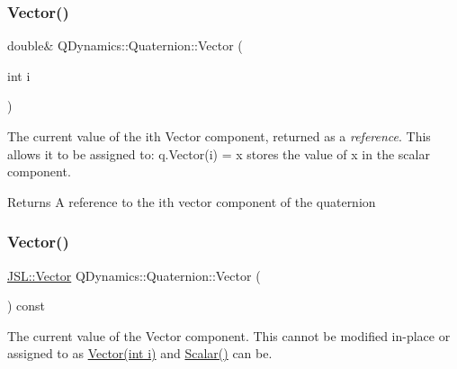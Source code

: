\mbox{\label{classQDynamics_1_1Quaternion_ad2f24d575d2fb8a50a9d4fd397115b9e}} 
\subsubsection{\texorpdfstring{Vector()}{Vector()}\hspace{0.1cm}{\footnotesize\ttfamily [1/3]}}
{\footnotesize\ttfamily double\& Q\+Dynamics\+::\+Quaternion\+::\+Vector (\begin{DoxyParamCaption}\item[{int}]{i }\end{DoxyParamCaption})\hspace{0.3cm}{\ttfamily [inline]}}



The current value of the ith Vector component, returned as a {\itshape reference}. This allows it to be assigned to\+: q.\+Vector(i) = x stores the value of x in the scalar component. 

\begin{DoxyReturn}{Returns}
A reference to the ith vector component of the quaternion 
\end{DoxyReturn}
\mbox{\label{classQDynamics_1_1Quaternion_ac35047116c055b5baeec49b8ebba0ede}} 
\subsubsection{\texorpdfstring{Vector()}{Vector()}\hspace{0.1cm}{\footnotesize\ttfamily [2/3]}}
{\footnotesize\ttfamily \hyperlink{classJSL_1_1Vector}{J\+S\+L\+::\+Vector} Q\+Dynamics\+::\+Quaternion\+::\+Vector (\begin{DoxyParamCaption}{ }\end{DoxyParamCaption}) const\hspace{0.3cm}{\ttfamily [inline]}}



The current value of the Vector component. This cannot be modified in-\/place or assigned to as \hyperlink{classQDynamics_1_1Quaternion_ad2f24d575d2fb8a50a9d4fd397115b9e}{Vector(int i)} and \hyperlink{classQDynamics_1_1Quaternion_a8121c47a579baffb9e692b8cd2c7dee7}{Scalar()} can be. 

